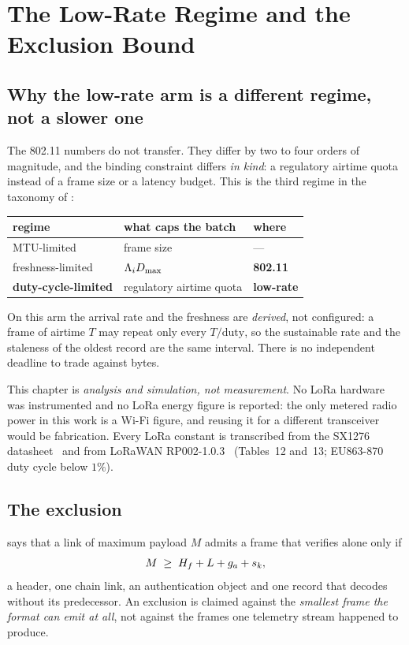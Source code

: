 \chapter{The Low-Rate Regime and the Exclusion Bound}\label{ch:lowrate}

\section{Why the low-rate arm is a different regime, not a slower one}

The 802.11 numbers do not transfer. They differ by two to four orders of magnitude, and the
binding constraint differs \emph{in kind}: a regulatory airtime quota instead of a frame size or a
latency budget. This is the third regime in the taxonomy of :

\begin{center}
\begin{tabular}{lll}
\toprule
regime & what caps the batch & where \\
\midrule
MTU-limited & frame size & --- \\
freshness-limited & $\Lambda_i D_{\max}$ & \textbf{802.11} \\
\textbf{duty-cycle-limited} & regulatory airtime quota & \textbf{low-rate} \\
\bottomrule
\end{tabular}
\end{center}

On this arm the arrival rate and the freshness are \emph{derived}, not configured: a frame of
airtime $T$ may repeat only every $T/\text{duty}$, so the sustainable rate and the staleness of the
oldest record are the same interval. There is no independent deadline to trade against bytes.

This chapter is \emph{analysis and simulation, not measurement}. No LoRa hardware was
instrumented and no LoRa energy figure is reported: the only metered radio power in this work is a
Wi-Fi figure, and reusing it for a different transceiver would be fabrication. Every LoRa constant
is transcribed from the SX1276 datasheet~\cite{semtech_sx1276} and from LoRaWAN
RP002-1.0.3~\cite{lora_rp002} (Tables~12 and~13; EU863-870 duty cycle below $1\%$).

\section{The exclusion}\label{sec:excl}

 says that a link of maximum payload $M$ admits a frame that verifies alone only if
\[ M \;\geq\; H_f + L + g_a + s_k , \]
a header, one chain link, an authentication object and one record that decodes without its
predecessor. An exclusion is claimed against the \emph{smallest frame the format can emit at
all}, not against the frames one telemetry stream happened to produce.

